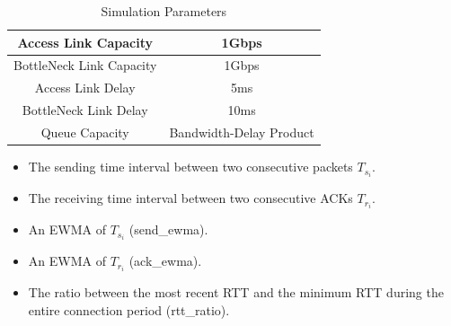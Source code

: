 \documentclass{beamer}
\begin{document}
\begin{frame}
\begin{table}
\begin{center}
\caption {Simulation Parameters} \label{tab:simuPara}
\begin{tabular}{ |c|c| }
 \hline
 Access Link Capacity & 1Gbps  \\
 \hline
 BottleNeck Link Capacity & 1Gbps  \\
 \hline
 Access Link Delay & 5ms  \\
 \hline
 BottleNeck Link Delay & 10ms\\
 \hline
 Queue Capacity & Bandwidth-Delay Product\\
 \hline
\end{tabular}
\end{center}
\end{table}
\begin{itemize}
\item The sending time interval between two consecutive packets $T_{s_{i}}$.
\item The receiving time interval between two consecutive ACKs $T_{r_{i}}$.
\item An EWMA of $T_{s_{i}}$ (send\_ewma).
\item An EWMA of $T_{r_{i}}$ (ack\_ewma).
\item The ratio between the most recent RTT and the minimum RTT during the entire connection period (rtt\_ratio).
\end{itemize}

\end{frame}
\end{document}

